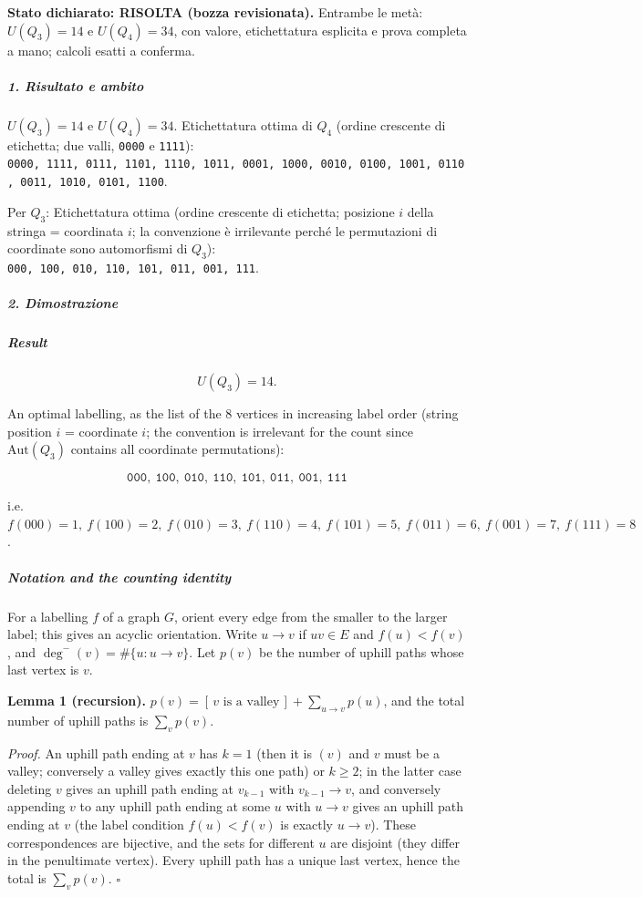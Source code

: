\documentclass[11pt,a4paper]{article}
\begin{document}
\textbf{Stato dichiarato: RISOLTA (bozza revisionata).} Entrambe le
metà: \(U(Q_3)=14\) e \(U(Q_4)=34\), con valore, etichettatura esplicita
e prova completa a mano; calcoli esatti a conferma.

\subparagraph{1. Risultato e ambito}\label{risultato-e-ambito}

\(U(Q_3) = 14\) e \(U(Q_4) = 34\). Etichettatura ottima di \(Q_4\)
(ordine crescente di etichetta; due valli, \texttt{0000} e
\texttt{1111}):
\texttt{0000,\ 1111,\ 0111,\ 1101,\ 1110,\ 1011,\ 0001,\ 1000,\ 0010,\ 0100,\ 1001,\ 0110,\ 0011,\ 1010,\ 0101,\ 1100}.

Per \(Q_3\): Etichettatura ottima (ordine crescente di etichetta;
posizione \(i\) della stringa = coordinata \(i\); la convenzione è
irrilevante perché le permutazioni di coordinate sono automorfismi di
\(Q_3\)): \texttt{000,\ 100,\ 010,\ 110,\ 101,\ 011,\ 001,\ 111}.

\subparagraph{2. Dimostrazione}\label{dimostrazione}

\subparagraph{Result}\label{result}

\[U(Q_3) = 14.\]

An optimal labelling, as the list of the 8 vertices in increasing label
order (string position \(i\) = coordinate \(i\); the convention is
irrelevant for the count since \(\mathrm{Aut}(Q_3)\) contains all
coordinate permutations):

\[\texttt{000},\ \texttt{100},\ \texttt{010},\ \texttt{110},\ \texttt{101},\ \texttt{011},\ \texttt{001},\ \texttt{111}\]

i.e.~\(f(000)=1,\ f(100)=2,\ f(010)=3,\ f(110)=4,\ f(101)=5,\ f(011)=6,\ f(001)=7,\ f(111)=8\).

\subparagraph{Notation and the counting
identity}\label{notation-and-the-counting-identity}

For a labelling \(f\) of a graph \(G\), orient every edge from the
smaller to the larger label; this gives an acyclic orientation. Write
\(u \to v\) if \(uv\in E\) and \(f(u)<f(v)\), and
\(\deg^-(v)=\#\{u: u\to v\}\). Let \(p(v)\) be the number of uphill
paths whose last vertex is \(v\).

\textbf{Lemma 1 (recursion).}
\(p(v) = [\,v \text{ is a valley}\,] + \sum_{u\to v} p(u)\), and the
total number of uphill paths is \(\sum_v p(v)\).

\emph{Proof.} An uphill path ending at \(v\) has \(k=1\) (then it is
\((v)\) and \(v\) must be a valley; conversely a valley gives exactly
this one path) or \(k\ge2\); in the latter case deleting \(v\) gives an
uphill path ending at \(v_{k-1}\) with \(v_{k-1}\to v\), and conversely
appending \(v\) to any uphill path ending at some \(u\) with \(u\to v\)
gives an uphill path ending at \(v\) (the label condition \(f(u)<f(v)\)
is exactly \(u\to v\)). These correspondences are bijective, and the
sets for different \(u\) are disjoint (they differ in the penultimate
vertex). Every uphill path has a unique last vertex, hence the total is
\(\sum_v p(v)\). \(\square\)
\end{document}
